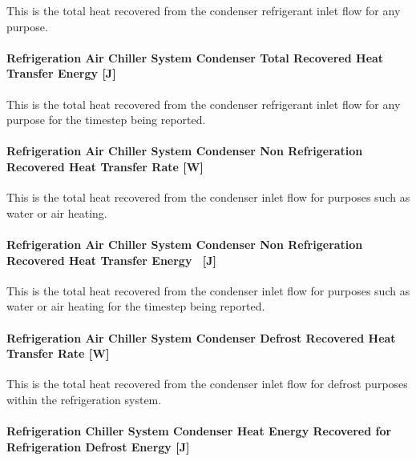This is the total heat recovered from the condenser refrigerant inlet flow for any purpose.

\paragraph{Refrigeration Air Chiller System Condenser Total Recovered Heat Transfer Energy {[}J{]}}\label{refrigeration-air-chiller-system-condenser-total-recovered-heat-transfer-energy-j-2}

This is the total heat recovered from the condenser refrigerant inlet flow for any purpose for the timestep being reported.

\paragraph{Refrigeration Air Chiller System Condenser Non Refrigeration Recovered Heat Transfer Rate {[}W{]}}\label{refrigeration-air-chiller-system-condenser-non-refrigeration-recovered-heat-transfer-rate-w-2}

This is the total heat recovered from the condenser inlet flow for purposes such as water or air heating.

\paragraph{Refrigeration Air Chiller System Condenser Non Refrigeration Recovered Heat Transfer Energy~ {[}J{]}}\label{refrigeration-air-chiller-system-condenser-non-refrigeration-recovered-heat-transfer-energy-j-2}

This is the total heat recovered from the condenser inlet flow for purposes such as water or air heating for the timestep being reported.

\paragraph{Refrigeration Air Chiller System Condenser Defrost Recovered Heat Transfer Rate {[}W{]}}\label{refrigeration-air-chiller-system-condenser-defrost-recovered-heat-transfer-rate-w-2}

This is the total heat recovered from the condenser inlet flow for defrost purposes within the refrigeration system.

\paragraph{Refrigeration Chiller System Condenser Heat Energy Recovered for Refrigeration Defrost Energy {[}J{]}}\label{refrigeration-chiller-system-condenser-heat-energy-recovered-for-refrigeration-defrost-energy-j}

